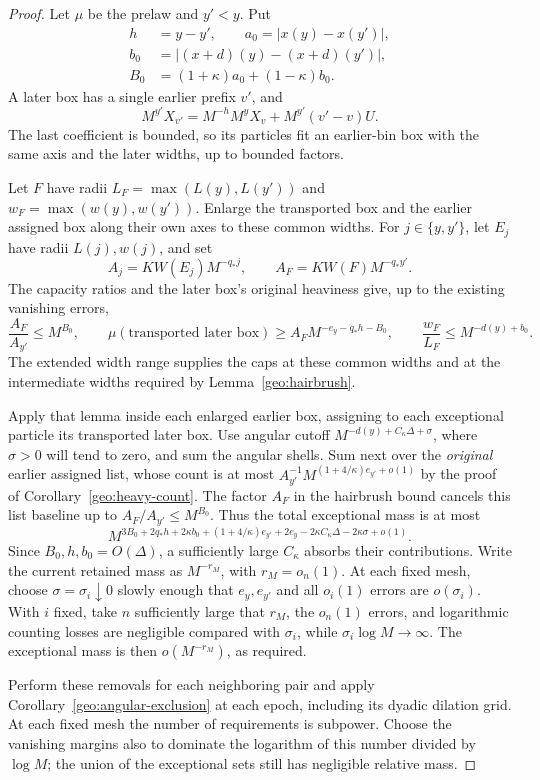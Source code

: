 \begin{proof}
Let \(\mu\) be the prelaw and \(y'<y\).  Put
\[
\begin{split}
h&=y-y',\qquad a_0=|x(y)-x(y')|,\\
b_0&=|(x+d)(y)-(x+d)(y')|,\\
B_0&=(1+\kappa)a_0+(1-\kappa)b_0.
\end{split}
\]
A later box has a single earlier prefix \(v'\), and
\[
M^{y'}X_{v'}=M^{-h}M^yX_v+M^{y'}(v'-v)U.
\]
The last coefficient is bounded, so its particles fit an earlier-bin
box with the same axis and the later widths, up to bounded factors.

Let \(F\) have radii \(L_F=\max(L(y),L(y'))\) and
\(w_F=\max(w(y),w(y'))\).  Enlarge the transported box and the
earlier assigned box along their own axes to these common widths.
For \(j\in\{y,y'\}\), let \(E_j\) have radii \(L(j),w(j)\), and set
\[
A_j=KW(E_j)M^{-q_*j},\qquad
A_F=KW(F)M^{-q_*y'}.
\]
The capacity ratios and the later box's original heaviness give,
up to the existing vanishing errors,
\[
\frac{A_F}{A_{y'}}\le M^{B_0},\qquad
\mu(\text{transported later box})
 \ge A_FM^{-e_y-q_*h-B_0},\qquad
\frac{w_F}{L_F}\le M^{-d(y)+b_0}.
\]
The extended width range supplies the caps at these common widths
and at the intermediate widths required by Lemma~\ref{geo:hairbrush}.

Apply that lemma inside each enlarged earlier box, assigning to
each exceptional particle its transported later box.  Use angular
cutoff \(M^{-d(y)+C_\kappa\Delta+\sigma}\), where \(\sigma>0\)
will tend to zero, and sum the angular shells.  Sum next over the
\emph{original} earlier assigned list, whose count is at most
\(A_{y'}^{-1}M^{(1+4/\kappa)e_{y'}+o(1)}\) by the proof of
Corollary~\ref{geo:heavy-count}.  The factor \(A_F\) in the
hairbrush bound cancels this list baseline up to
\(A_F/A_{y'}\le M^{B_0}\).  Thus the total exceptional mass is at
most
\[
M^{3B_0+2q_*h+2\kappa b_0+(1+4/\kappa)e_{y'}+2e_y
      -2\kappa C_\kappa\Delta-2\kappa\sigma+o(1)}.
\]
Since \(B_0,h,b_0=O(\Delta)\), a sufficiently large
\(C_\kappa\) absorbs their contributions.  Write the current
retained mass as \(M^{-r_M}\), with \(r_M=o_n(1)\).  At each
fixed mesh, choose \(\sigma=\sigma_i\downarrow0\) slowly enough
that \(e_y,e_{y'}\) and all \(o_i(1)\) errors are \(o(\sigma_i)\).
With \(i\) fixed, take \(n\) sufficiently large that \(r_M\), the
\(o_n(1)\) errors, and logarithmic counting losses are negligible
compared with \(\sigma_i\), while \(\sigma_i\log M\to\infty\).
The exceptional mass is then \(o(M^{-r_M})\), as required.

Perform these removals for each neighboring pair and apply
Corollary~\ref{geo:angular-exclusion} at each epoch, including its
dyadic dilation grid.  At each fixed mesh the number of requirements
is subpower.  Choose the vanishing margins also to dominate the
logarithm of this number divided by \(\log M\); the union of the
exceptional sets still has negligible relative mass.
\end{proof}

